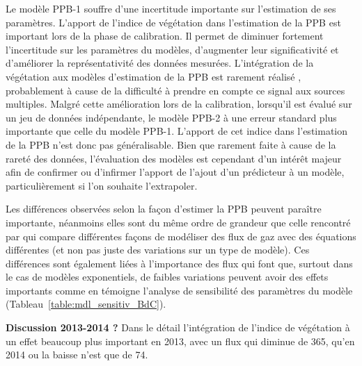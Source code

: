 Le modèle PPB-1 souffre d'une incertitude importante sur l'estimation de ses paramètres.
L'apport de l'indice de végétation dans l'estimation de la PPB est important lors de la phase de calibration.
Il permet de diminuer fortement l'incertitude sur les paramètres du modèles, d'augmenter leur significativité et d'améliorer la représentativité des données mesurées.
L'intégration de la végétation aux modèles d'estimation de la PPB est rarement réalisé \citep{bortoluzzi2006,gorres2014}, probablement à cause de la difficulté à prendre en compte ce signal aux sources multiples.
Malgré cette amélioration lors de la calibration, lorsqu'il est évalué sur un jeu de données indépendante, le modèle PPB-2 à une erreur standard plus importante que celle du modèle PPB-1.
L'apport de cet indice dans l'estimation de la PPB n'est donc pas généralisable.
Bien que rarement faite à cause de la rareté des données, l'évaluation des modèles est cependant d'un intérêt majeur afin de confirmer ou d'infirmer l'apport de l'ajout d'un prédicteur à un modèle, particulièrement si l'on souhaite l'extrapoler.

Les différences observées selon la façon d'estimer la PPB peuvent paraître importante, néanmoins elles sont du même ordre de grandeur que celle rencontré par \citet{worrall2009} qui compare différentes façons de modéliser des flux de gaz avec des équations différentes (et non pas juste des variations sur un type de modèle).
Ces différences sont également liées à l'importance des flux qui font que, surtout dans le cas de modèles exponentiels, de faibles variations peuvent avoir des effets importants comme en témoigne l'analyse de sensibilité des paramètres du modèle (Tableau~\ref{table:mdl_sensitiv_BdC}).

\textbf{Discussion 2013-2014 ?}
Dans le détail l'intégration de l'indice de végétation à un effet beaucoup plus important en 2013, avec un flux qui diminue de \SI{365}{\gcma}, qu'en 2014 ou la baisse n'est que de \SI{74}{\gcma}.


